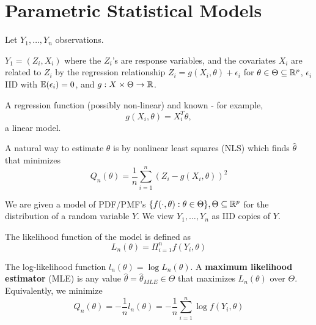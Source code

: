 
\chapter{Parametric Statistical Models}
\label{cha:param-stat-models}

Let $Y_{1}, \dots, Y_{n}$ observations.

\begin{exmp}
  \label{defn:parametric_statistical_models:3}
  $Y_{1} = (Z_{i}, X_{i})$ where the $Z_{i}$'s are response variables,
  and the covariates $X_{i}$ are related to $Z_{i}$ by the regression
  relationship $Z_{i} = g(X_{i}, \theta) + \epsilon_{i}$ for $\theta
  \in \Theta \subseteq \mathbb{R}^{p}$, $\epsilon_{i}$ IID with
  $\E{\epsilon_{i}} = 0$, and $g: X \times \Theta \rightarrow \mathbb{R}$.

  A regression function (possibly non-linear) and known - for example,
  \begin{equation}
    \label{eq:14}
    g(X_{i}, \theta) = X_{i}^{T} \theta,
  \end{equation} a linear model.
\end{exmp}


A natural way to estimate $\theta$ is by nonlinear least squares (NLS)
which finds $\hat \theta$ that minimizes
\begin{equation}
  \label{eq:20}
  Q_{n}(\theta) = \frac{1}{n} \sum_{i=1}^{n}(Z_{i}- g(X_{i}, \theta))^{2}
\end{equation}

\begin{exmp}
  \label{defn:parametric_statistical_models:2}
  We are given a model of PDF/PMF's $\{ f(\cdot, \theta): \theta \in
  \Theta \}, \Theta \subseteq \mathbb{R}^{p}$ for the distribution of a random
  variable $Y$.  We view $Y_{1}, \dots, Y_{n}$ as IID copies of $Y$.

  The likelihood function of the model  is defined as
  \begin{equation}
    \label{eq:30}
    L_{n}(\theta) = \Pi_{i=1}^{n} f(Y_{i}, \theta)
  \end{equation}

  The log-likelihood function $l_{n}(\theta) = \log L_{n}(\theta)$.  A
  \textbf{maximum likelihood estimator} (MLE) is any value $\hat
  \theta = \hat \theta_{MLE} \in \Theta$ that maximizes
  $L_{n}(\theta)$ over $\Theta$.  Equivalently, we minimize
  \begin{equation}
    \label{eq:31}
    Q_{n}(\theta) = -\frac{1}{n} l_{n}(\theta) = - \frac{1}{n}
    \sum_{i=1}^{n} \log f(Y_{i}, \theta)
  \end{equation}
\end{exmp}

